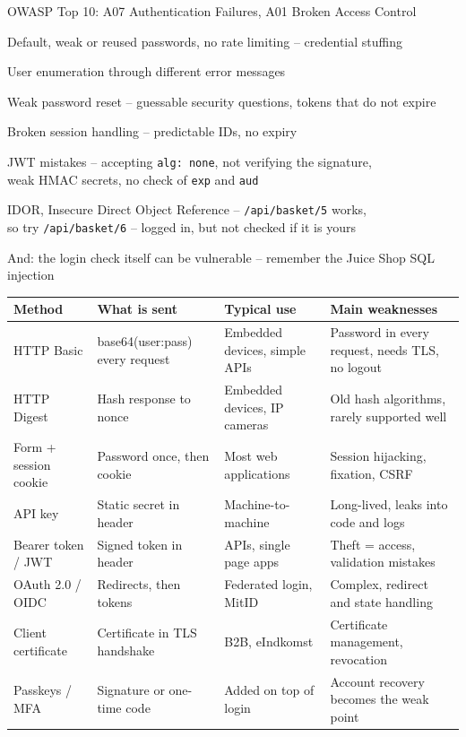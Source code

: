 \documentclass[Screen16to9,17pt]{foils}
\begin{document}

\begin{list2}
\item OWASP Top 10: A07 Authentication Failures, A01 Broken Access Control
\item Default, weak or reused passwords, no rate limiting -- credential stuffing
\item User enumeration through different error messages
\item Weak password reset -- guessable security questions, tokens that do not expire
\item Broken session handling -- predictable IDs, no expiry
\item JWT mistakes -- accepting \verb+alg: none+, not verifying the signature,\\
  weak HMAC secrets, no check of \verb+exp+ and \verb+aud+
\item IDOR, Insecure Direct Object Reference -- \verb+/api/basket/5+ works,\\
  so try \verb+/api/basket/6+ -- logged in, but not checked if it is yours
\item And: the login check itself can be vulnerable -- remember the Juice Shop SQL injection
\end{list2}



{\small
\begin{tabular}{p{4cm}p{5cm}p{4.2cm}p{7.2cm}}
\textbf{Method} & \textbf{What is sent} & \textbf{Typical use} & \textbf{Main weaknesses}\\\hline
HTTP Basic & base64(user:pass) every request & Embedded devices, simple APIs & Password in every request, needs TLS, no logout\\
HTTP Digest & Hash response to nonce & Embedded devices, IP cameras & Old hash algorithms, rarely supported well\\
Form + session cookie & Password once, then cookie & Most web applications & Session hijacking, fixation, CSRF\\
API key & Static secret in header & Machine-to-machine & Long-lived, leaks into code and logs\\
Bearer token / JWT & Signed token in header & APIs, single page apps & Theft = access, validation mistakes\\
OAuth 2.0 / OIDC & Redirects, then tokens & Federated login, MitID & Complex, redirect and state handling\\
Client certificate & Certificate in TLS handshake & B2B, eIndkomst & Certificate management, revocation\\
Passkeys / MFA & Signature or one-time code & Added on top of login & Account recovery becomes the weak point\\
\end{tabular}
}
\end{document}
